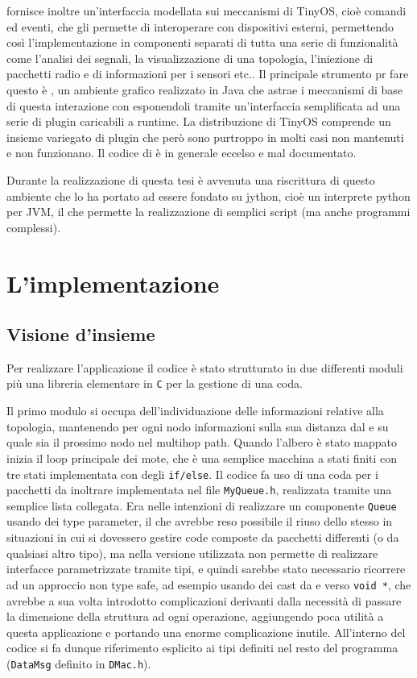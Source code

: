 \documentclass[twoside,11pt,a4paper,italian,openany]{book}
\begin{document}
\tos fornisce inoltre un'interfaccia modellata sui meccanismi di TinyOS, cioè comandi ed eventi, 
che gli permette di interoperare con dispositivi esterni, permettendo così l'implementazione 
in componenti separati di tutta una serie di funzionalità come l'analisi dei segnali, 
la visualizzazione di una topologia, l'iniezione di pacchetti radio e di informazioni per 
i sensori etc.. 
Il principale strumento pr fare questo è \tv, un ambiente grafico realizzato in Java che 
astrae i meccanismi di base di questa 
interazione con \tos esponendoli tramite un'interfaccia semplificata ad una serie 
di plugin caricabili a runtime.  
La distribuzione di TinyOS comprende un insieme variegato di plugin che 
però sono purtroppo in molti casi non mantenuti e non funzionano. Il codice di \tv è 
in generale eccelso e mal documentato. 

Durante la realizzazione di questa tesi è avvenuta una riscrittura di 
questo ambiente che lo ha portato ad essere fondato su jython\cite{tython}, 
cioè un interprete python per JVM, il che permette la realizzazione di semplici script 
(ma anche programmi complessi).  
 

\chapter{L'implementazione}
\section{Visione d'insieme}
Per realizzare l'applicazione il codice è stato strutturato in due differenti moduli più 
una libreria elementare in \texttt{C} per la gestione di una coda.

Il primo modulo si occupa dell'individuazione delle informazioni relative alla topologia, 
mantenendo per ogni nodo informazioni sulla sua distanza dal \sink e su quale sia il prossimo 
nodo nel multihop path.  
Quando l'albero è stato mappato inizia il loop principale dei mote, che è una 
semplice macchina a stati finiti con tre stati implementata con degli \texttt{if/else}.
Il codice fa uso di una coda per i pacchetti da inoltrare implementata nel file \texttt{MyQueue.h}, realizzata tramite una semplice lista collegata.
Era nelle intenzioni di realizzare un componente \texttt{Queue} usando dei type parameter, 
il che avrebbe reso possibile il riuso dello stesso in situazioni in cui si dovessero gestire 
code composte da pacchetti differenti (o da qualsiasi altro tipo), ma \nesc nella versione 
utilizzata non permette di 
realizzare interfacce parametrizzate tramite tipi, e quindi sarebbe stato necessario ricorrere 
ad un approccio non type safe, ad esempio usando dei cast da e verso \texttt{void *}, che  
avrebbe a sua volta introdotto complicazioni derivanti dalla necessità di passare la dimensione 
della struttura ad ogni operazione, aggiungendo poca utilità a questa applicazione e portando  
una enorme complicazione inutile.
All'interno del codice si fa dunque riferimento esplicito ai tipi 
definiti nel resto del programma (\texttt{DataMsg} definito in \texttt{DMac.h}).
\end{document}
